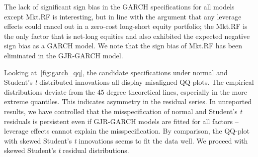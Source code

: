 The lack of significant sign bias in the GARCH specifications for all models except Mkt.RF is interesting, but in line with the argument that any leverage effects could cancel out in a zero-cost long-short equity portfolio; the Mkt.RF is the only factor that is net-long equities and also exhibited the expected negative sign bias as a GARCH model. We note that the sign bias of Mkt.RF has been eliminated in the GJR-GARCH model.

Looking at~\autoref{fig:garch_qq}, the candidate specifications under normal and Student's \textit{t} distributed innovations all display misaligned QQ-plots. The empirical distributions deviate from the 45 degree theoretical lines, especially in the more extreme quantiles. This indicates asymmetry in the residual series. In unreported results, we have controlled that the misspecification of normal and Student's \textit{t} residuals is persistent even if GJR-GARCH models are fitted for all factors -- leverage effects cannot explain the misspecification. By comparison, the QQ-plot with skewed Student's \textit{t} innovations seems to fit the data well. We proceed with skewed Student's \textit{t} residual distributions.

